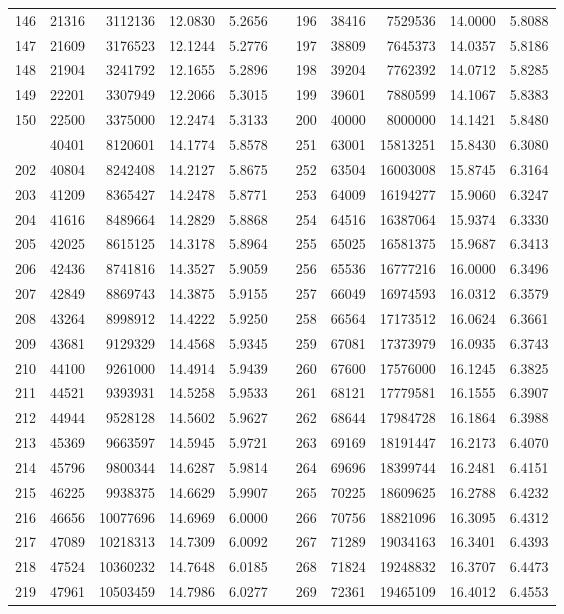 \begin{longtable}{rrrrrrrrrrr}
146&21316&3112136&12.0830&5.2656&&196&38416&7529536&14.0000&5.8088\\
147&21609&3176523&12.1244&5.2776&&197&38809&7645373&14.0357&5.8186\\
148&21904&3241792&12.1655&5.2896&&198&39204&7762392&14.0712&5.8285\\
149&22201&3307949&12.2066&5.3015&&199&39601&7880599&14.1067&5.8383\\
150&22500&3375000&12.2474&5.3133&&200&40000&8000000&14.1421&5.8480\\
\newpage
201&40401&8120601&14.1774&5.8578&&251&63001&15813251&15.8430&6.3080\\
202&40804&8242408&14.2127&5.8675&&252&63504&16003008&15.8745&6.3164\\
203&41209&8365427&14.2478&5.8771&&253&64009&16194277&15.9060&6.3247\\
204&41616&8489664&14.2829&5.8868&&254&64516&16387064&15.9374&6.3330\\
205&42025&8615125&14.3178&5.8964&&255&65025&16581375&15.9687&6.3413\\
206&42436&8741816&14.3527&5.9059&&256&65536&16777216&16.0000&6.3496\\
207&42849&8869743&14.3875&5.9155&&257&66049&16974593&16.0312&6.3579\\
208&43264&8998912&14.4222&5.9250&&258&66564&17173512&16.0624&6.3661\\
209&43681&9129329&14.4568&5.9345&&259&67081&17373979&16.0935&6.3743\\
210&44100&9261000&14.4914&5.9439&&260&67600&17576000&16.1245&6.3825\\
211&44521&9393931&14.5258&5.9533&&261&68121&17779581&16.1555&6.3907\\
212&44944&9528128&14.5602&5.9627&&262&68644&17984728&16.1864&6.3988\\
213&45369&9663597&14.5945&5.9721&&263&69169&18191447&16.2173&6.4070\\
214&45796&9800344&14.6287&5.9814&&264&69696&18399744&16.2481&6.4151\\
215&46225&9938375&14.6629&5.9907&&265&70225&18609625&16.2788&6.4232\\
216&46656&10077696&14.6969&6.0000&&266&70756&18821096&16.3095&6.4312\\
217&47089&10218313&14.7309&6.0092&&267&71289&19034163&16.3401&6.4393\\
218&47524&10360232&14.7648&6.0185&&268&71824&19248832&16.3707&6.4473\\
219&47961&10503459&14.7986&6.0277&&269&72361&19465109&16.4012&6.4553\\

\end{longtable}
